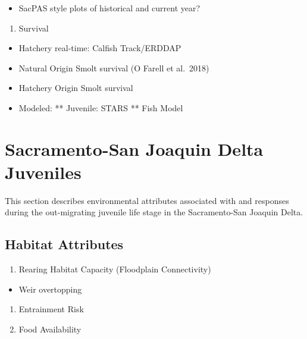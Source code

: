 \documentclass[
]{book}
\providecommand{\tightlist}{%
  \setlength{\itemsep}{0pt}\setlength{\parskip}{0pt}}
\theoremstyle{definition}
\theoremstyle{definition}
\theoremstyle{definition}
\theoremstyle{definition}
\theoremstyle{remark}
\begin{document}
\begin{itemize}
\tightlist
\item
  SacPAS style plots of historical and current year?
\end{itemize}

\begin{enumerate}
\def\labelenumi{\arabic{enumi}.}
\setcounter{enumi}{3}
\tightlist
\item
  Survival
\end{enumerate}

\begin{itemize}
\tightlist
\item
  Hatchery real-time: Calfish Track/ERDDAP
\item
  Natural Origin Smolt survival (O Farell et al.~2018)
\item
  Hatchery Origin Smolt survival
\item
  Modeled: ** Juvenile: STARS ** Fish Model
\end{itemize}

\hypertarget{sacramento-san-joaquin-delta-juveniles}{%
\chapter{Sacramento-San Joaquin Delta Juveniles}\label{sacramento-san-joaquin-delta-juveniles}}

This section describes environmental attributes associated with and responses during the out-migrating juvenile life stage in the Sacramento-San Joaquin Delta.

\hypertarget{habitat-attributes-4}{%
\section{Habitat Attributes}\label{habitat-attributes-4}}

\begin{enumerate}
\def\labelenumi{\arabic{enumi}.}
\tightlist
\item
  Rearing Habitat Capacity (Floodplain Connectivity)
\end{enumerate}

\begin{itemize}
\tightlist
\item
  Weir overtopping
\end{itemize}

\begin{enumerate}
\def\labelenumi{\arabic{enumi}.}
\setcounter{enumi}{1}
\item
  Entrainment Risk
\item
  Food Availability
\end{enumerate}
\end{document}
